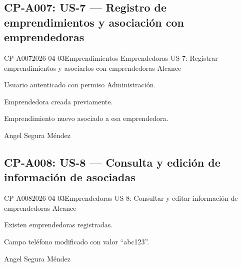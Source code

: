 \subsection{CP-A007: US-7 --- Registro de emprendimientos y asociación con emprendedoras}
\def\cpPasos{%
  \item Crear emprendedora nueva.
  \item Crear emprendimiento y asociarlo a la emprendedora.
  \item Verificar que el emprendimiento muestra la emprendedora asociada.
  \item Editar el emprendimiento y cambiar la emprendedora.}
\def\cpResultadoE{%
  \item Los emprendimientos se registran y asocian correctamente con emprendedoras.}
\def\cpResultadoO{La creación, asociación y edición de emprendimientos con emprendedoras
  funcionan correctamente.}
\casoprueba
  {CP-A007}{2026-04-03}{Emprendimientos \arr{} Emprendedoras}
  {US-7: Registrar emprendimientos y asociarlos con emprendedoras}
  {Alcance}{\estadoAprobado}
  {\item Usuario autenticado con permiso Administración.}
  {\item Emprendedora creada previamente.
   \item Emprendimiento nuevo asociado a esa emprendedora.}
  {Angel Segura Méndez}

\subsection{CP-A008: US-8 --- Consulta y edición de información de asociadas}
\def\cpPasos{%
  \item Navegar a Emprendedoras \arr{} editar una emprendedora.
  \item Modificar el campo teléfono con letras y números mezclados.
  \item Guardar.}
\def\cpResultadoE{%
  \item La edición funciona correctamente.
  \item El campo teléfono solo acepta números.}
\def\cpResultadoO{La edición se guardó correctamente. Sin embargo,
  \textcolor{rojo}{el campo teléfono acepta letras}, lo que no es un formato válido
  para un número de teléfono. Falta validación de formato. (Ver HAL-005)}
\casoprueba
  {CP-A008}{2026-04-03}{Emprendedoras}
  {US-8: Consultar y editar información de emprendedoras}
  {Alcance}{\estadoParcial}
  {\item Existen emprendedoras registradas.}
  {\item Campo teléfono modificado con valor ``abc123''.}
  {Angel Segura Méndez}

